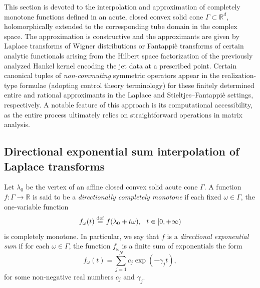 \documentclass[11pt,reqno]{amsart}
\theoremstyle{plain}
\theoremstyle{definition}
\numberwithin{equation}{section}
\newcommand{\bydef}{\stackrel{\rm def}{=}}
\begin{document}
	This section is devoted to the interpolation and approximation of completely monotone functions defined in an acute, closed convex solid cone $\Gamma \subset \mathbb{R}^d$, holomorphically extended to the corresponding tube domain in the complex space. The approximation is constructive and the approximants are given by Laplace transforms of Wigner distributions or Fantappi\`e transforms of certain analytic functionals arising from the Hilbert space factorization of the previously analyzed Hankel kernel encoding the jet data at a prescribed point. 
    Certain canonical tuples of \textit{non-commuting} symmetric operators appear in the realization-type formulae (adopting control theory terminology) for these finitely determined entire and rational approximants in the Laplace and Stieltjes–Fantappi\`e settings, respectively. A notable feature of this approach is its computational accessibility, as the entire process ultimately relies on straightforward operations in matrix analysis.
    



\subsection{Directional exponential sum interpolation of Laplace transforms} \label{Subsec:Laplace-interpolation}
Let $\lambda_0$ be the vertex of an affine closed convex solid acute cone $\Gamma$. A function $f: \Gamma \to \mathbb{R}$ is said to be a {\em directionally completely monotone} if each fixed $\omega \in \Gamma$, the one-variable function 
$$
f_\omega(t) \bydef f(\lambda_0 + t \omega), \ \ t \in [0, +\infty)
$$
is completely monotone. In particular, we say that $f$ is a {\em directional exponential sum} if for each $\omega \in \Gamma$, the function $f_\omega$ is a finite sum of exponentials the form 
$$
f_\omega(t) = \sum_{j=1}^N c_j \exp(-\gamma_j t),
$$
for some non-negative real numbers $c_j$ and $\gamma_j$.
\end{document}
